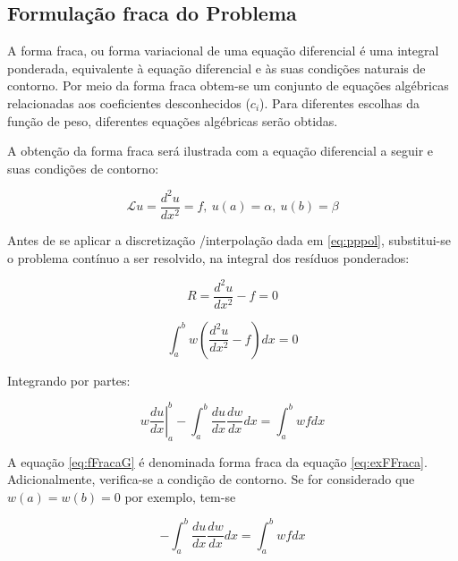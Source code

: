 \subsection{Formulação fraca do Problema}

A forma fraca, ou forma variacional de uma equação diferencial é uma integral ponderada, equivalente à equação diferencial e às suas condições naturais de contorno. Por meio da forma fraca obtem-se um conjunto de equações algébricas relacionadas aos coeficientes desconhecidos ($c_i$). Para diferentes escolhas da função de peso, diferentes equações algébricas serão obtidas.
\citep[p. 64]{(reddy)}

A obtenção da forma fraca será ilustrada com a equação diferencial a seguir e suas condições de contorno:

\begin{equation}
	\label{eq:exFFraca}
	\mathcal{L}u = \frac{d^2 u}{dx^2} = f, \ u(a) = \alpha, \ u(b) = \beta
\end{equation}

Antes de se aplicar a discretização /interpolação dada em \ref{eq:pppol}, substitui-se o problema contínuo a ser resolvido, na integral dos resíduos ponderados:

\begin{equation}
	R = \frac{d^2 u}{dx^2} - f = 0
\end{equation}

 \begin{equation}
	\int_{a}^{b} w\left(\frac{d^2 u}{dx^2} - f\right) dx = 0
 \end{equation} 
 
 Integrando por partes:
 
 \begin{equation}
 \label{eq:fFracaG}
 \left.w \frac{du}{dx}\right|_{a}^{b} - 
	\int_{a}^{b} 
	\frac{du}{dx} \frac{dw}{dx} dx = \int_{a}^{b} wf dx
 \end{equation} 

A equação \ref{eq:fFracaG} é denominada forma fraca da equação \ref{eq:exFFraca}. Adicionalmente, verifica-se a condição de contorno. Se for considerado que $ w(a) = w(b) = 0$ por exemplo, tem-se

 \begin{equation}
 \label{eq:fFracaG}
 - 	\int_{a}^{b} 
	\frac{du}{dx} \frac{dw}{dx} dx = \int_{a}^{b} wf dx
 \end{equation} 
